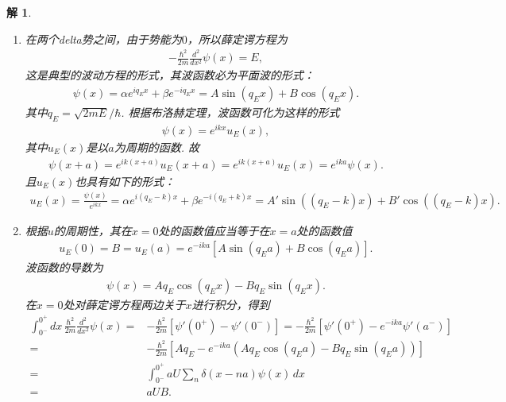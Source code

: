 \documentclass[UTF8,10pt,a4paper]{article}
\theoremstyle{Problem}
\theoremstyle{Solution}
\newtheorem*{sol}{解}
\begin{document}
\begin{sol}
    \begin{enumerate}
        \item[(a)] 在两个delta势之间，由于势能为$0$，所以薛定谔方程为
        \begin{align}
            -\frac{\hbar^2}{2m}\frac{d^2}{dx^2}\psi(x)=E,
        \end{align}
        这是典型的波动方程的形式，其波函数必为平面波的形式：
        \begin{align}
            \psi(x)=\alpha e^{iq_Ex}+\beta e^{-iq_Ex}=A\sin(q_Ex)+B\cos(q_Ex).
        \end{align}
        其中$q_E=\sqrt{2mE}/\hbar$.
        根据布洛赫定理，波函数可化为这样的形式
        \begin{align}
            \psi(x)=e^{ikx}u_E(x),
        \end{align}
        其中$u_E(x)$是以$a$为周期的函数. 故
        \begin{align}
            \psi(x+a)=e^{ik(x+a)}u_E(x+a)=e^{ik(x+a)}u_E(x)=e^{ika}\psi(x).
        \end{align}
        且$u_E(x)$也具有如下的形式：
        \begin{align}
            u_E(x)=\frac{\psi(x)}{e^{ikx}}=\alpha e^{i(q_E-k)x}+\beta e^{-i(q_E+k)x}=A'\sin((q_E-k)x)+B'\cos((q_E-k)x).
        \end{align}
        \item[(b)] 根据$u$的周期性，其在$x=0$处的函数值应当等于在$x=a$处的函数值
        \begin{align}
            u_E(0)=B=u_E(a)=e^{-ika}[A\sin(q_Ea)+B\cos(q_Ea)].
        \end{align}
        波函数的导数为
        \begin{align}
            \label{5-1}
            \psi(x)=Aq_E\cos(q_Ex)-Bq_E\sin(q_Ex).
        \end{align}
        在$x=0$处对薛定谔方程两边关于$x$进行积分，得到
        \begin{align}
            \nonumber\int_{0^-}^{0^+}dx\,\frac{\hbar^2}{2m}\frac{d^2}{dx^2}\psi(x)=&-\frac{\hbar^2}{2m}[\psi'(0^+)-\psi'(0^-)]=-\frac{\hbar^2}{2m}[\psi'(0^+)-e^{-ika}\psi'(a^-)]\\
            \nonumber=&-\frac{\hbar^2}{2m}[Aq_E-e^{-ika}(Aq_E\cos(q_Ea)-Bq_E\sin(q_Ea))]\\
            =&\int_{0^-}^{0^+}aU\sum_n\delta(x-na)\psi(x)\,dx\\
			=&aUB.
        \end{align}
        \begin{align}

\end{align}
\end{enumerate}
\end{sol}
\end{document}
